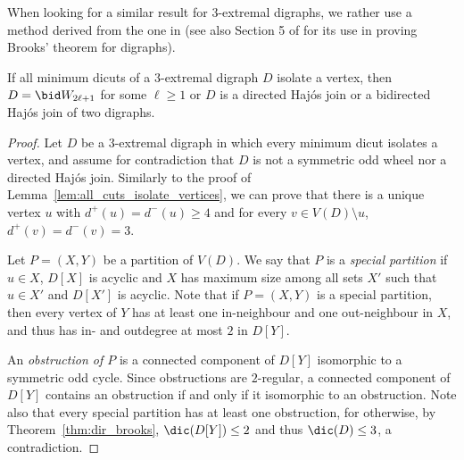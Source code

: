 When looking for a similar result for $3$-extremal digraphs, we rather use a method derived from the one in \cite{L66} (see also Section 5 of \cite{AA22} for its use in proving Brooks' theorem for digraphs).

\begin{lemma}\label{lem:all_cuts_isolate_vertices_three}
    If all minimum dicuts of a $3$-extremal digraph $D$ isolate a vertex, then $D = \bid W_{2\ell+1}$ for some $\ell \geq 1$ or $D$ is a directed Haj\'os join or a bidirected Haj\'os join of two digraphs.
\end{lemma}

\begin{proof}
    Let $D$ be a $3$-extremal digraph in which every minimum dicut isolates a vertex, and assume for contradiction that $D$ is not a symmetric odd wheel nor a directed Haj\'os join.
    Similarly to the proof of Lemma~\ref{lem:all_cuts_isolate_vertices}, we can prove that there is a unique vertex $u$ with $d^+(u) = d^-(u) \geq 4$ and for every $v \in V(D) \setminus u$, $d^+(v) =d^-(v) = 3$. %
    

    Let $P = (X,Y)$ be a partition of $V(D)$. We say that $P$ is  a \emph{special partition} if $u \in X$, $D[X]$ is acyclic and $X$ has maximum size among all sets $X'$ such that $u \in X'$ and $D[X']$ is acyclic. Note that if $P=(X,Y)$ is a special partition, then every vertex of $Y$ has at least one in-neighbour and one out-neighbour in $X$, and thus has in- and outdegree at most $2$ in $D[Y]$. 
    
    An \emph{obstruction of $P$} is a connected component of $D[Y]$ isomorphic to a symmetric odd cycle. Since obstructions are $2$-regular, a connected component of $D[Y]$ contains an obstruction if and only if it isomorphic to an obstruction. Note also that every special partition has at least one obstruction, for otherwise, by Theorem~\ref{thm:dir_brooks}, $\dic(D[Y]) \leq 2$ and thus $\dic(D) \leq 3$, a contradiction.
    

\end{proof}
